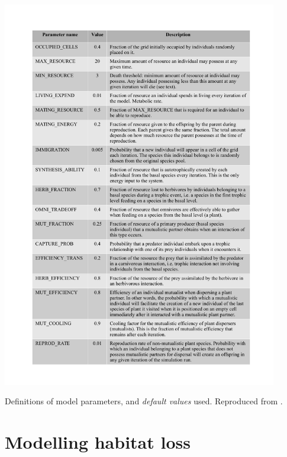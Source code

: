 
\begin{table}[hp!]
\centering
\includegraphics[width=0.9\textwidth]{"tables/IBM_parameters"}
\caption{Definitions of model parameters, and \emph{default values} used. Reproduced from \cite{lurgi2015effects}.}
\label{tab:IBM_parameters}
\end{table}

\section{Modelling habitat loss}
\label{sec:model_HL}

